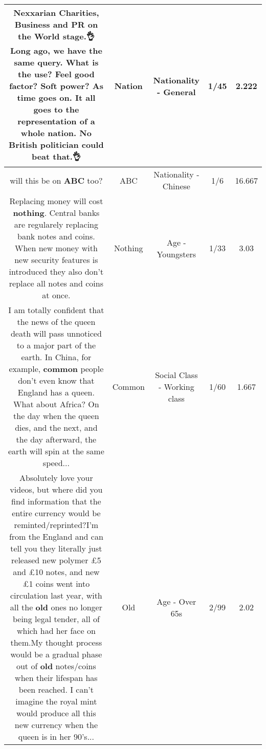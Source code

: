 \documentclass[11pt]{article}
\newlength\mylength
\begin{document}
\begin{center}
\begin{longtable}{|C{.65\mylength}|C{.30\mylength}|C{.12\mylength}|C{.12\mylength}|C{.12\mylength}|}
  \small Nexxarian Charities, Business and PR on the World stage.👌 Long ago, we have the same query. What is the use? Feel good factor? Soft power? As time goes on. It all goes to the representation of a whole \textbf{nation}. No British politician could beat that.👌\normalsize   & Nation & Nationality - General & 1/45 & 2.222 \\  \hline
  \small will this be on \textbf{ABC} too?\normalsize   & ABC & Nationality - Chinese & 1/6 & 16.667 \\  \hline
  \small Replacing money will cost \textbf{nothing}. Central banks are regularely replacing bank notes and coins. When new money with new security features is introduced they also don't replace all notes and coins at once.\normalsize   & Nothing & Age - Youngsters & 1/33 & 3.03 \\  \hline
  \small I am totally confident that the news of the queen death will pass unnoticed to a major part of the earth. In China, for example, \textbf{common} people don't even know that England has a queen. What about Africa? On the day when the queen dies, and the next, and the day afterward, the earth will spin at the same speed...\normalsize   & Common & Social Class - Working class & 1/60 & 1.667 \\  \hline
  \small Absolutely love your videos, but where did you find information that the entire currency would be reminted/reprinted?I'm from the England and can tell you they literally just released new polymer £5 and £10 notes, and new £1 coins went into circulation last year, with all the \textbf{old} ones no longer being legal tender, all of which had her face on them.My thought process would be a gradual phase out of \textbf{old} notes/coins when their lifespan has been reached. I can't imagine the royal mint would produce all this new currency when the queen is in her 90's...\normalsize   & Old & Age - Over 65s & 2/99 & 2.02 \\  \hline

\end{longtable}
\end{center}
\end{document}
